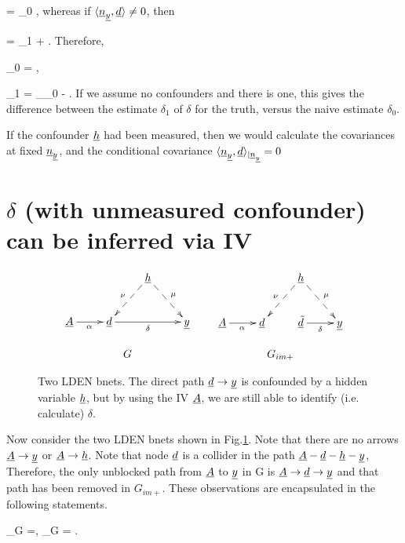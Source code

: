\beq
\av{\rvy, \rvd} = \delta_0 \av{\rvd, \rvd}
\;,
\eeq
whereas if
$\langle{\underline{n}}_{\underline{y}}, {\underline{d}}\rangle\neq 0$, then

\beq
\av{\rvy, \rvd} = \delta_1 \av{\rvd, \rvd}
+ \av{\rvn_\rvy, \rvd}
\;.
\eeq
Therefore,


\beq
\delta_0 = \frac{\av{\rvy, \rvd}}{\av{\rvd, \rvd}}
\;,
\eeq

\beq
\delta_1 =
\underbrace{\frac{\av{\rvy, \rvd}}{\av{\rvd, \rvd}}}_{\delta_0}
-
\frac{\av{\rvn_\rvy, \rvd}}{\av{\rvd, \rvd}}
\;.
\eeq  
If we assume no confounders
and there is one, this gives the difference
between the estimate $\delta_1$ of $\delta$ for
the truth, versus
the naive estimate $\delta_0$.

If the confounder ${\underline{h}}$
had been measured, then
we would calculate 
the covariances at fixed ${\underline{n}}_{\underline{y}}$,
and 
the conditional covariance 
$\langle{\underline{n}}_{\underline{y}}, {\underline{d}}\rangle_{|{\underline{n}}_{\underline{y}}}=0$

\section{$\delta$
(with unmeasured confounder)
can be
inferred via IV}



\begin{figure}[h!]
$$
\begin{array}{ccc}
\xymatrix{
&&\rvh\ar@{-->}[dl]_\nu\ar@{-->}[dr]^\mu
\\
\rvA\ar[r]_\alpha
&\rvd\ar[rr]_\delta
&&\rvy
}
&&
\xymatrix{
&&\rvh\ar@{-->}[dl]_\nu\ar@{-->}[dr]^\mu
\\
\rvA\ar[r]_\alpha
&\rvd&
\rvtd\ar[r]_\delta
&\rvy}
\\
\\
G&&G_{im+}
\end{array}
$$
\caption{
Two LDEN bnets. The direct path ${\underline{d}}\rightarrow{\underline{y}}$
is confounded by
a hidden variable ${\underline{h}}$, but
by using the IV ${\underline{A}}$, we are still
able to 
identify (i.e. calculate)
$\delta$.
}
\label{fig-iv-G-im}
\end{figure}

Now consider the two LDEN bnets 
shown in Fig.\ref{fig-iv-G-im}.
Note that there are no arrows
${\underline{A}}\rightarrow{\underline{y}}$
or 
${\underline{A}}\rightarrow{\underline{h}}$. Note that
node ${\underline{d}}$ is a collider
in the path 
${\underline{A}}-{\underline{d}}-{\underline{h}}-{\underline{y}}$, 
Therefore,
the only unblocked path
from ${\underline{A}}$ to 
${\underline{y}}$ in G 
is ${\underline{A}}\rightarrow{\underline{d}}\rightarrow{\underline{y}}$
and that path has been
removed in $G_{im+}$. These
observations are 
encapsulated in the following statements.

\beq
\rvd\perp_{G} \rvy =, 
\;\; \rvA\perp_{G} \rvy= 
\;.
\eeq


